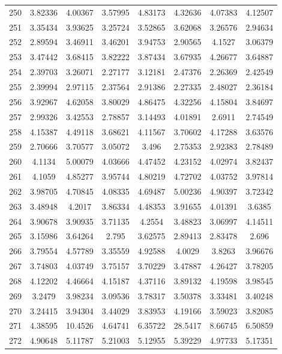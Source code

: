 \begin{figure}
\begin{tabular}{cccccccc}
250 & 3.82336 & 4.00367 & 3.57995 & 4.83173 & 4.32636 & 4.07383 & 4.12507\\
251 & 3.35434 & 3.93625 & 3.25724 & 3.52865 & 3.62068 & 3.26576 & 2.94634\\
252 & 2.89594 & 3.46911 & 3.46201 & 3.94753 & 2.90565 & 4.1527 & 3.06379\\
253 & 3.47442 & 3.68415 & 3.82222 & 3.87434 & 3.67935 & 4.26677 & 3.64887\\
254 & 2.39703 & 3.26071 & 2.27177 & 3.12181 & 2.47376 & 2.26369 & 2.42549\\
255 & 2.39994 & 2.97115 & 2.37564 & 2.91386 & 2.27335 & 2.48027 & 2.36184\\
256 & 3.92967 & 4.62058 & 3.80029 & 4.86475 & 4.32256 & 4.15804 & 3.84697\\
257 & 2.99326 & 3.42553 & 2.78857 & 3.14493 & 4.01891 & 2.6911 & 2.74549\\
258 & 4.15387 & 4.49118 & 3.68621 & 4.11567 & 3.70602 & 4.17288 & 3.63576\\
259 & 2.70666 & 3.70577 & 3.05072 & 3.496 & 2.75353 & 2.92383 & 2.78489\\
260 & 4.1134 & 5.00079 & 4.03666 & 4.47452 & 4.23152 & 4.02974 & 3.82437\\
261 & 4.1059 & 4.85277 & 3.95744 & 4.80219 & 4.72702 & 4.03752 & 3.97814\\
262 & 3.98705 & 4.70845 & 4.08335 & 4.69487 & 5.00236 & 4.90397 & 3.72342\\
263 & 3.48948 & 4.2017 & 3.86334 & 4.48353 & 3.91655 & 4.01391 & 3.6385\\
264 & 3.90678 & 3.90935 & 3.71135 & 4.2554 & 3.48823 & 3.06997 & 4.14511\\
265 & 3.15986 & 3.64264 & 2.795 & 3.62575 & 2.89413 & 2.83478 & 2.696\\
266 & 3.79554 & 4.57789 & 3.35559 & 4.92588 & 4.0029 & 3.8263 & 3.96676\\
267 & 3.74803 & 4.03749 & 3.75157 & 3.70229 & 3.47887 & 4.26427 & 3.78205\\
268 & 4.12202 & 4.46664 & 4.15187 & 4.37116 & 3.89132 & 4.19598 & 3.98545\\
269 & 3.2479 & 3.98234 & 3.09536 & 3.78317 & 3.50378 & 3.33481 & 3.40248\\
270 & 3.24415 & 3.94304 & 3.44029 & 3.83953 & 4.19166 & 3.59023 & 3.82085\\
271 & 4.38595 & 10.4526 & 4.64741 & 6.35722 & 28.5417 & 8.66745 & 6.50859\\
272 & 4.90648 & 5.11787 & 5.21003 & 5.12955 & 5.39229 & 4.97733 & 5.17351\\

\end{tabular}
\end{figure}
